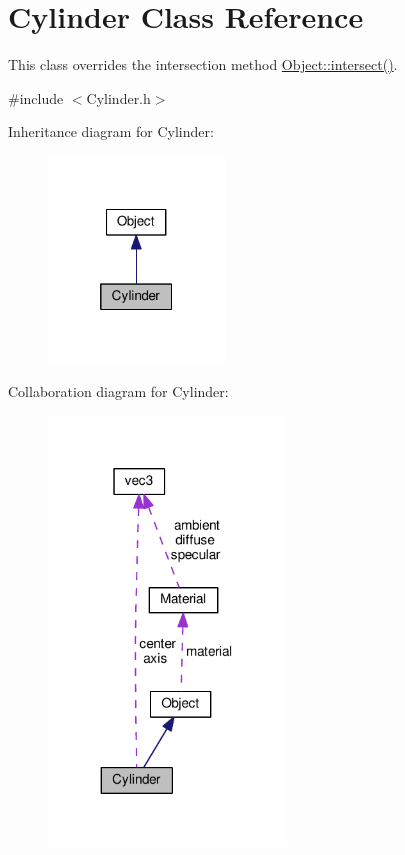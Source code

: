 \hypertarget{classCylinder}{}\section{Cylinder Class Reference}
\label{classCylinder}


This class overrides the intersection method \hyperlink{structObject_ac6549d30793a9b3da070234bf10c7e91}{Object\+::intersect()}.  




{\ttfamily \#include $<$Cylinder.\+h$>$}



Inheritance diagram for Cylinder\+:
\nopagebreak
\begin{figure}[H]
\begin{center}
\leavevmode
\includegraphics[width=133pt]{classCylinder__inherit__graph}
\end{center}
\end{figure}


Collaboration diagram for Cylinder\+:
\nopagebreak
\begin{figure}[H]
\begin{center}
\leavevmode
\includegraphics[width=179pt]{classCylinder__coll__graph}
\end{center}
\end{figure}
